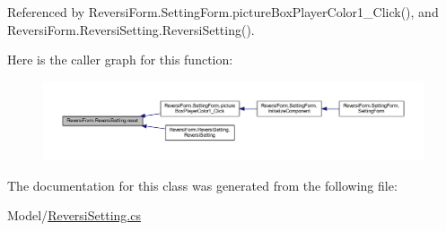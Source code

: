 Referenced by Reversi\+Form.\+Setting\+Form.\+picture\+Box\+Player\+Color1\+\_\+\+Click(), and Reversi\+Form.\+Reversi\+Setting.\+Reversi\+Setting().

Here is the caller graph for this function\+:
\nopagebreak
\begin{figure}[H]
\begin{center}
\leavevmode
\includegraphics[width=350pt]{class_reversi_form_1_1_reversi_setting_a2334691b0fa7c13674742c97a50a2e04_icgraph}
\end{center}
\end{figure}


The documentation for this class was generated from the following file\+:\begin{DoxyCompactItemize}
\item 
Model/\hyperlink{_reversi_setting_8cs}{Reversi\+Setting.\+cs}\end{DoxyCompactItemize}
